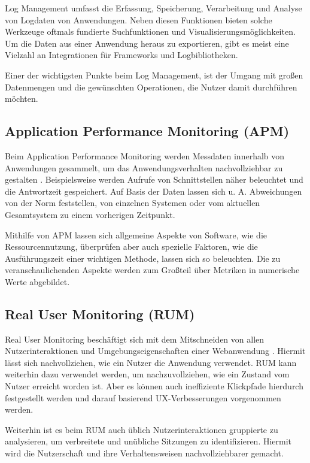 Log Management umfasst die Erfassung, Speicherung, Verarbeitung und Analyse von Logdaten von Anwendungen. Neben diesen Funktionen bieten solche Werkzeuge oftmals fundierte Suchfunktionen und Visualisierungsmöglichkeiten. Um die Daten aus einer Anwendung heraus zu exportieren, gibt es meist eine Vielzahl an Integrationen für Frameworks und Logbibliotheken.

Einer der wichtigsten Punkte beim Log Management, ist der Umgang mit großen Datenmengen und die gewünschten Operationen, die Nutzer damit durchführen möchten.

\subsection{Application Performance Monitoring (APM)}

Beim Application Performance Monitoring werden Messdaten innerhalb von Anwendungen gesammelt, um das Anwendungsverhalten nachvollziehbar zu gestalten \cite{StudyingTheEffectivenessOfAPMTools}. Beispielsweise werden Aufrufe von Schnittstellen näher beleuchtet und die Antwortzeit gespeichert. Auf Basis der Daten lassen sich u. A. Abweichungen von der Norm feststellen, von einzelnen Systemen oder vom aktuellen Gesamtsystem zu einem vorherigen Zeitpunkt.

Mithilfe von APM lassen sich allgemeine Aspekte von Software, wie die Ressourcennutzung, überprüfen aber auch spezielle Faktoren, wie die Ausführungszeit einer wichtigen Methode, lassen sich so beleuchten. Die zu veranschaulichenden Aspekte werden zum Großteil über Metriken in numerische Werte abgebildet.

\subsection{Real User Monitoring (RUM)}


Real User Monitoring beschäftigt sich mit dem Mitschneiden von allen Nutzerinteraktionen und Umgebungseigenschaften einer Webanwendung \cite{IdentifyingWebPerformanceDegradations}. Hiermit lässt sich nachvollziehen, wie ein Nutzer die Anwendung verwendet. RUM kann weiterhin dazu verwendet werden, um nachzuvollziehen, wie ein Zustand vom Nutzer erreicht worden ist. Aber es können auch ineffiziente Klickpfade hierdurch festgestellt werden und darauf basierend UX-Verbesserungen vorgenommen werden.

Weiterhin ist es beim RUM auch üblich Nutzerinteraktionen gruppierte zu analysieren, um verbreitete und unübliche Sitzungen zu identifizieren. Hiermit wird die Nutzerschaft und ihre Verhaltensweisen nachvollziehbarer gemacht.

